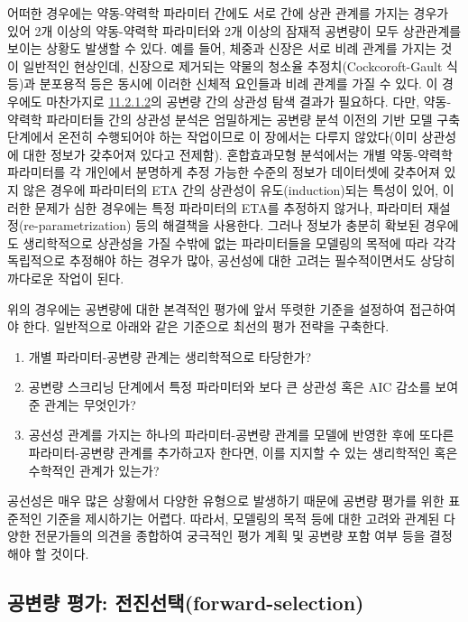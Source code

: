 \documentclass[
  10pt,
  krantz2,
  a4paper]{krantz}
\providecommand{\tightlist}{%
  \setlength{\itemsep}{0pt}\setlength{\parskip}{0pt}}
\theoremstyle{definition}
\theoremstyle{definition}
\theoremstyle{definition}
\theoremstyle{remark}
\begin{document}
어떠한 경우에는 약동-약력학 파라미터 간에도 서로 간에 상관 관계를 가지는 경우가 있어 2개 이상의 약동-약력학 파라미터와 2개 이상의 잠재적 공변량이 모두 상관관계를 보이는 상황도 발생할 수 있다. 예를 들어, 체중과 신장은 서로 비례 관계를 가지는 것이 일반적인 현상인데, 신장으로 제거되는 약물의 청소율 추정치(Cockcoroft-Gault 식 등)과 분포용적 등은 동시에 이러한 신체적 요인들과 비례 관계를 가질 수 있다. 이 경우에도 마찬가지로 \protect\hyperlink{potential-cov}{11.2.1.2}의 공변량 간의 상관성 탐색 결과가 필요하다. 다만, 약동-약력학 파라미터들 간의 상관성 분석은 엄밀하게는 공변량 분석 이전의 기반 모델 구축 단계에서 온전히 수행되어야 하는 작업이므로 이 장에서는 다루지 않았다(이미 상관성에 대한 정보가 갖추어져 있다고 전제함). 혼합효과모형 분석에서는 개별 약동-약력학 파라미터를 각 개인에서 분명하게 추정 가능한 수준의 정보가 데이터셋에 갖추어져 있지 않은 경우에 파라미터의 ETA 간의 상관성이 유도(induction)되는 특성이 있어, 이러한 문제가 심한 경우에는 특정 파라미터의 ETA를 추정하지 않거나, 파라미터 재설정(re-parametrization) 등의 해결책을 사용한다. 그러나 정보가 충분히 확보된 경우에도 생리학적으로 상관성을 가질 수밖에 없는 파라미터들을 모델링의 목적에 따라 각각 독립적으로 추정해야 하는 경우가 많아, 공선성에 대한 고려는 필수적이면서도 상당히 까다로운 작업이 된다.

위의 경우에는 공변량에 대한 본격적인 평가에 앞서 뚜렷한 기준을 설정하여 접근하여야 한다. 일반적으로 아래와 같은 기준으로 최선의 평가 전략을 구축한다.

\begin{enumerate}
\def\labelenumi{\arabic{enumi}.}
\tightlist
\item
  개별 파라미터-공변량 관계는 생리학적으로 타당한가?
\item
  공변량 스크리닝 단계에서 특정 파라미터와 보다 큰 상관성 혹은 AIC 감소를 보여준 관계는 무엇인가?
\item
  공선성 관계를 가지는 하나의 파라미터-공변량 관계를 모델에 반영한 후에 또다른 파라미터-공변량 관계를 추가하고자 한다면, 이를 지지할 수 있는 생리학적인 혹은 수학적인 관계가 있는가?
\end{enumerate}

공선성은 매우 많은 상황에서 다양한 유형으로 발생하기 때문에 공변량 평가를 위한 표준적인 기준을 제시하기는 어렵다. 따라서, 모델링의 목적 등에 대한 고려와 관계된 다양한 전문가들의 의견을 종합하여 궁극적인 평가 계획 및 공변량 포함 여부 등을 결정해야 할 것이다.

\hypertarget{uxacf5uxbcc0uxb7c9-uxd3c9uxac00-uxc804uxc9c4uxc120uxd0ddforward-selection}{%
\subsection{\texorpdfstring{공변량 평가: 전진선택(forward-selection)}{공변량 평가: 전진선택(forward-selection)}}\label{uxacf5uxbcc0uxb7c9-uxd3c9uxac00-uxc804uxc9c4uxc120uxd0ddforward-selection}}
\end{document}
